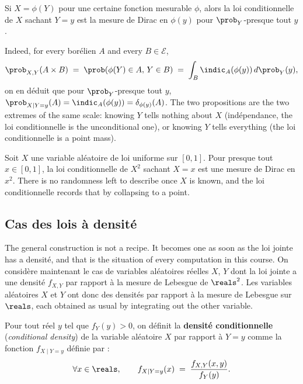 \begin{prop}
  Si $X = \phi(Y)$ pour une certaine fonction mesurable $\phi$, alors la loi
  conditionnelle de $X$ sachant $Y = y$ est la mesure de Dirac en $\phi(y)$ pour
  $\prob_{Y}$-presque tout $y$.
\end{prop}

Indeed, for every borélien $A$ and every $B \in \mathcal{E}$,
\[
  \prob_{X,Y}(A \times B) \;=\; \prob(\phi(Y) \in A, \, Y \in B)
  \;=\; \int_{B} \indic_{A}(\phi(y)) \, d\prob_{Y}(y) ,
\]
on en déduit que pour $\prob_{Y}$-presque tout $y$,
$\prob_{X \mid Y = y}(A) = \indic_{A}(\phi(y)) = \delta_{\phi(y)}(A)$. The two
propositions are the two extremes of the same scale: knowing $Y$ tells nothing
about $X$ (indépendance, the loi conditionnelle is the unconditional one), or
knowing $Y$ tells everything (the loi conditionnelle is a point mass).

\begin{example}
  Soit $X$ une variable aléatoire de loi uniforme sur $[0,1]$. Pour presque tout
  $x \in [0,1]$, la loi conditionnelle de $X^{2}$ sachant $X = x$ est une mesure de
  Dirac en $x^{2}$. There is no randomness left to describe once $X$ is known, and
  the loi conditionnelle records that by collapsing to a point.
\end{example}

\subsection{Cas des lois à densité}

The general construction is not a recipe. It becomes one as soon as the loi jointe
has a densité, and that is the situation of every computation in this course.
On considère maintenant le cas de variables aléatoires réelles $X$, $Y$ dont la loi
jointe a une densité $f_{X,Y}$ par rapport à la mesure de Lebesgue de $\reals^{2}$.
Les variables aléatoires $X$ et $Y$ ont donc des densités par rapport à la mesure de
Lebesgue sur $\reals$, each obtained as usual by integrating out the other variable.

\begin{definition}
  Pour tout réel $y$ tel que $f_{Y}(y) > 0$, on définit la \textbf{densité
  conditionnelle} (\textit{conditional density}) de la variable aléatoire $X$ par
  rapport à $Y = y$ comme la fonction $f_{X \mid Y = y}$ définie par :
  \[
    \forall x \in \reals, \qquad
    f_{X \mid Y = y}(x) \;=\; \frac{f_{X,Y}(x,y)}{f_{Y}(y)} .
  \]
\end{definition}

